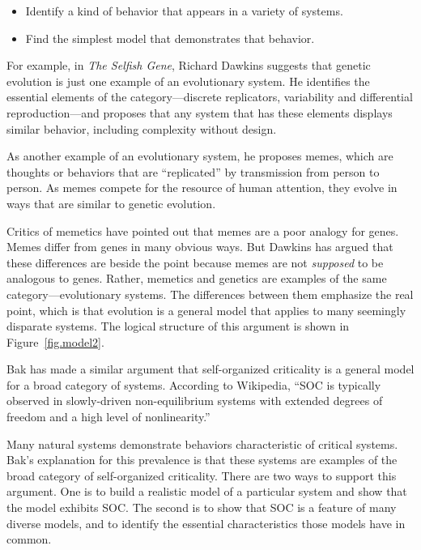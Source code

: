 \documentclass[10pt]{book}
\begin{document}
\begin{itemize}

\item Identify a kind of behavior that appears in a variety of
systems.

\item Find the simplest model that demonstrates that behavior.

\end{itemize}

For example, in {\em The Selfish Gene}, Richard Dawkins suggests that
genetic evolution is just one example of an evolutionary system.  He
identifies the essential elements of the category---discrete
replicators, variability and differential reproduction---and proposes
that any system that has these elements displays similar
behavior, including complexity without design.

As another example of an evolutionary system, he proposes memes, which
are thoughts or behaviors that are ``replicated'' by transmission from
person to person.  As memes compete for the resource of human
attention, they evolve in ways that are similar to genetic evolution.

Critics of memetics have pointed out that memes are a poor analogy
for genes.  Memes differ from genes in many obvious ways.  But
Dawkins has argued that these differences are beside the point
because memes are not {\em supposed} to be analogous to genes.
Rather, memetics and genetics are examples of the same
category---evolutionary systems.  The differences between them
emphasize the real point, which is that evolution is a general model
that applies to many seemingly disparate systems.  The logical
structure of this argument is shown in Figure~\ref{fig.model2}.

Bak has made a similar argument that self-organized criticality is a
general model for a broad category of systems.  According to
Wikipedia, ``SOC is typically observed in slowly-driven
non-equilibrium systems with extended degrees of freedom and a high
level of nonlinearity.''

Many natural systems demonstrate behaviors characteristic of critical
systems.  Bak's explanation for this prevalence is that these systems
are examples of the broad category of self-organized criticality.
There are two ways to support this argument.  One is to build
a realistic model of a particular system and show that the model
exhibits SOC.  The second is to show that SOC is a feature of many
diverse models, and to identify the essential characteristics
those models have in common.
\end{document}
